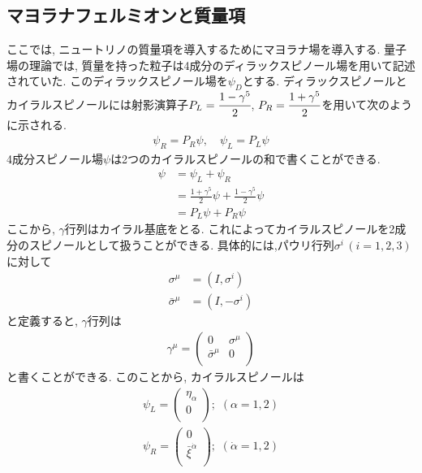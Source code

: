 \subsection{マヨラナフェルミオンと質量項}
ここでは, ニュートリノの質量項を導入するためにマヨラナ場を導入する.
量子場の理論では, 質量を持った粒子は4成分のディラックスピノール場を用いて記述されていた.
このディラックスピノール場を$\psi_D$とする.
ディラックスピノールとカイラルスピノールには射影演算子$P_L = \cfrac{1-\gamma^5}{2}$, $P_R = \cfrac{1+\gamma^5}{2}$を用いて次のように示される.
\begin{align}
  \psi_R = P_R \psi,\quad \psi_L = P_L \psi\nonumber
\end{align}
4成分スピノール場$\psi$は2つのカイラルスピノールの和で書くことができる.
\begin{align}
  \psi &= \psi_L + \psi_R\nonumber\\
       &= \frac{1+\gamma^5}{2}\psi + \frac{1-\gamma^5}{2}\psi\nonumber\\
       &= P_L\psi + P_R\psi\label{Mj_1}
\end{align}
ここから, $\gamma$行列はカイラル基底をとる.
これによってカイラルスピノールを2成分のスピノールとして扱うことができる.
具体的には,パウリ行列$\sigma^{i}\,(i=1,2,3)$に対して
\begin{align}
  \sigma ^\mu &= ( I, \sigma^i )\nonumber\\
  \bar{\sigma} ^\mu &= (I, -\sigma^i ) \nonumber
\end{align}
と定義すると, 
$\gamma$行列は
\begin{align}
  \gamma ^{\mu} = \left(\begin{array}{cc}
                             0 &  \sigma ^{\mu}     \\
                             \bar{\sigma}^{\mu} & 0 \\
                           \end{array}
                           \right)
\end{align}
と書くことができる.
このことから, カイラルスピノールは
\begin{align}
  \psi_L = \left( \begin{array}{c}
                   \eta_\alpha \\
                   0 \\
                 \end{array}
                 \right);\,\,(\alpha =1,2)\nonumber\\
  \psi_R = \left(\begin{array}{c}
                   0 \\
                   \bar{\xi}^{\dot{\alpha}} \\
                 \end{array}
           \right);\,\,(\dot{\alpha} = 1,2)
\end{align}
